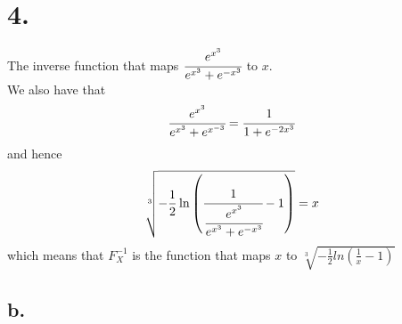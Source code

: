 \documentclass[11pt]{article}
\begin{document}
\section*{4.}
The inverse function that maps $\cfrac{e^{x^3}}{e^{x^3} + e^{-x^3}}$ to $x$. \\
We also have that 
\[
    \cfrac{e^{x^3}}{e^{x^3} + e^{x^{-3}}} = \cfrac{1}{1 + e^{-2x^3}}
\]
and hence 
\[
    \sqrt[3]{-\frac{1}{2}\ln\left(\cfrac{1}{\cfrac{e^{x^3}}{e^{x^3} + e^{-x^3}}}-1\right)} = x    
\]
which means that $F^{-1}_X$ is the function that maps $x$ to $\sqrt[3]{-\frac{1}{2}ln(\frac{1}{x}-1)}$ 
\subsection*{b.}
\end{document}
